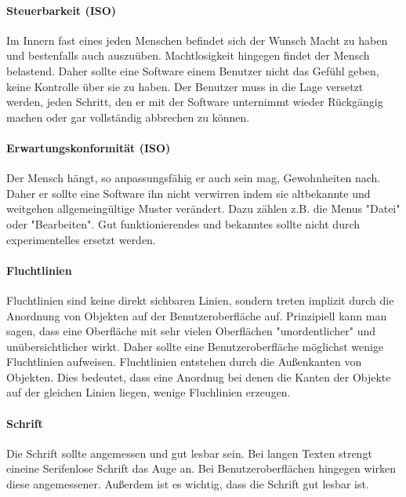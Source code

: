 \paragraph{Steuerbarkeit (ISO)}

Im Innern fast eines jeden Menschen befindet sich der Wunsch Macht zu haben und
bestenfalls auch auszuüben. Machtlosigkeit hingegen findet der Mensch belastend. 
Daher sollte eine Software einem Benutzer nicht das Gefühl geben, keine
Kontrolle über sie zu haben. Der Benutzer muss in die Lage versetzt werden,
jeden Schritt, den er mit der Software unternimmt wieder Rückgängig machen oder
gar vollständig abbrechen zu können. 

\paragraph{Erwartungskonformität (ISO)}

Der Mensch hängt, so anpassungsfähig er auch sein mag, Gewohnheiten nach. Daher
er sollte eine Software ihn nicht verwirren indem sie altbekannte und weitgehen
allgemeingültige Muster verändert. Dazu zählen z.B. die Menus "Datei" oder
"Bearbeiten". Gut funktionierendes und bekanntes sollte nicht durch
experimentelles ersetzt werden.

\paragraph{Fluchtlinien}

Fluchtlinien sind keine direkt sichbaren Linien, sondern treten implizit durch
die Anordnung von Objekten auf der Benutzeroberfläche auf. Prinzipiell kann man
sagen, dass eine Oberfläche mit sehr vielen Oberflächen "unordentlicher" und
unübersichtlicher wirkt. Daher sollte eine Benutzeroberfläche möglichst wenige
Fluchtlinien aufweisen. Fluchtlinien entstehen durch die Außenkanten von
Objekten. Dies bedeutet, dass eine Anordnug bei denen die Kanten der Objekte auf 
der gleichen Linien liegen, wenige Fluchlinien erzeugen.

\paragraph{Schrift}

Die Schrift sollte angemessen und gut lesbar sein. Bei langen Texten strengt
eineine Serifenlose Schrift das Auge an. Bei Benutzeroberflächen hingegen wirken
diese angemessener. Außerdem ist es wichtig, dass die Schrift gut lesbar ist.

